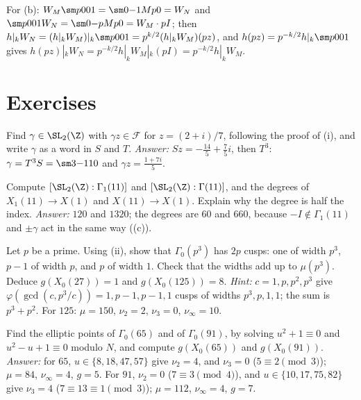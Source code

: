 For (b): $W_M\sm p001=\sm0{-1}{Mp}0=W_N$ and $\sm p001W_N=\sm0{-p}{Mp}0=W_M\cdot pI$; then $h|_kW_N=(h|_kW_M)|_k\sm p001=p^{k/2}(h|_kW_M)(pz)$, and $h(pz)=p^{-k/2}h|_k\sm p001$ gives
$h(pz)|_kW_N=p^{-k/2}h|_kW_M|_k(pI)=p^{-k/2}h|_kW_M$.

\section{Exercises}\label{sec:modforms:exercises}

\begin{exercise}\label{ex:modforms:ex-reduce}
Find $\gamma\in\SL_2(\Z)$ with $\gamma z\in\mathcal F$ for $z=(2+i)/7$, following the proof of (i), and write $\gamma$ as a word in $S$ and $T$.
\emph{Answer:} $Sz=-\frac{14}5+\frac75i$, then $T^3$: $\gamma=T^3S=\sm3{-1}10$ and $\gamma z=\frac{1+7i}5$.
\end{exercise}

\begin{exercise}\label{ex:modforms:ex-gamma1}
Compute $[\SL_2(\Z):\Gamma_1(11)]$ and $[\SL_2(\Z):\Gamma(11)]$, and the degrees of $X_1(11)\to X(1)$ and $X(11)\to X(1)$. Explain why the degree is half the index.
\emph{Answer:} $120$ and $1320$; the degrees are $60$ and $660$, because $-I\notin\Gamma_1(11)$ and $\pm\gamma$ act in the same way ((c)).
\end{exercise}

\begin{exercise}\label{ex:modforms:ex-cusps-p3}
Let $p$ be a prime. Using (ii), show that $\Gamma_0(p^3)$ has $2p$ cusps: one of width $p^3$, $p-1$ of width $p$, and $p$ of width $1$. Check that the
widths add up to $\mu(p^3)$. Deduce $g(X_0(27))=1$ and $g(X_0(125))=8$.
\emph{Hint:} $c=1,p,p^2,p^3$ give $\varphi(\gcd(c,p^3/c))=1,p-1,p-1,1$ cusps of widths $p^3,p,1,1$; the sum is $p^3+p^2$. For $125$: $\mu=150$, $\nu_2=2$, $\nu_3=0$, $\nu_\infty=10$.
\end{exercise}

\begin{exercise}\label{ex:modforms:ex-elliptic}
Find the elliptic points of $\Gamma_0(65)$ and of $\Gamma_0(91)$, by solving $u^2+1\equiv0$ and $u^2-u+1\equiv0$ modulo $N$, and compute $g(X_0(65))$ and $g(X_0(91))$.
\emph{Answer:} for $65$, $u\in\{8,18,47,57\}$ give $\nu_2=4$, and $\nu_3=0$ ($5\equiv2\pmod3$); $\mu=84$, $\nu_\infty=4$, $g=5$. For $91$, $\nu_2=0$ ($7\equiv3\pmod4$), and
$u\in\{10,17,75,82\}$ give $\nu_3=4$ ($7\equiv13\equiv1\pmod3$); $\mu=112$, $\nu_\infty=4$, $g=7$.
\end{exercise}

